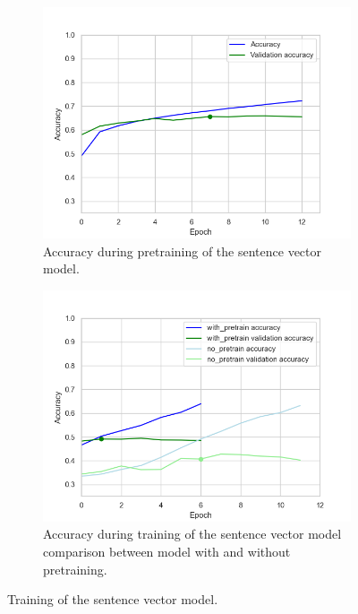 \documentclass[acmsmall,nonacm]{acmart}
\begin{document}
\begin{figure}[!h]
  \begin{subfigure}[b]{0.45\textwidth}
    \includegraphics[width=\textwidth]{assets/lstm_classifier_accuracy.png}
    \caption{Accuracy during pretraining of the sentence vector model.}
    \label{fig:lstm_model_pretrain}
  \end{subfigure}
  \hfill
  \begin{subfigure}[b]{0.45\textwidth}
    \includegraphics[width=\textwidth]{assets/lstm_classifier_comparison_with_pretrain_no_pretrain.png}
    \caption{Accuracy during training of the sentence vector model comparison between model with and without pretraining.}
    \label{fig:lstm_model_train}
  \end{subfigure}
  \caption{Training of the sentence vector model.}
  \label{fig:lstm_model_training}
\end{figure}
\end{document}
